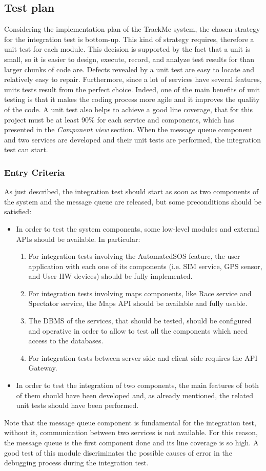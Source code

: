 \subsection{Test plan}
Considering the implementation plan of the TrackMe system, the chosen strategy for the integration test is bottom-up. 
This kind of strategy requires, therefore a unit test for each module. 
This decision is supported by the fact that a unit is small, so it is easier to design, execute, record, and analyze test results for than larger chunks of code are. 
Defects revealed by a unit test are easy to locate and relatively easy to repair. Furthermore, since a lot of services have several features, units tests result from the perfect choice. Indeed, one of the main benefits of unit testing is that it makes the coding process more agile and it improves the quality of the code. A unit test also helps to achieve a good line coverage, that for this project must be at least 90\% for each service and components, which has presented in the \textit{Component view} section. When the message queue component and two services are developed and their unit tests are performed, the integration test can start. 
\subsubsection{Entry Criteria}
As just described, the integration test should start as soon as two components of the system and the message queue are released, but some preconditions should be satisfied:
\begin{itemize}
\item In order to test the system components, some low-level modules and external APIs should be available. In particular: 
\begin{enumerate}
\item For integration tests involving the AutomatedSOS feature, the user application with each one of its components (i.e. SIM service, GPS sensor, and User HW devices) should be fully implemented.
\item For integration tests involving maps components, like Race service and Spectator service, the Maps API should be available and fully usable.
\item The DBMS of the services, that should be tested, should be configured and operative in order to allow to test all the components which need access to the databases.
\item For integration tests between server side and client side requires the API Gateway.
\end{enumerate}
\item In order to test the integration of two components, the main features of both of them should have been developed and, as already mentioned, the related unit tests should have been performed.
\end{itemize}
Note that the message queue component is fundamental for the integration test, without it, communication between two services is not available. For this reason, the message queue is the first component done and its line coverage is so high. A good test of this module discriminates the possible causes of error in the debugging process during the integration test.  
